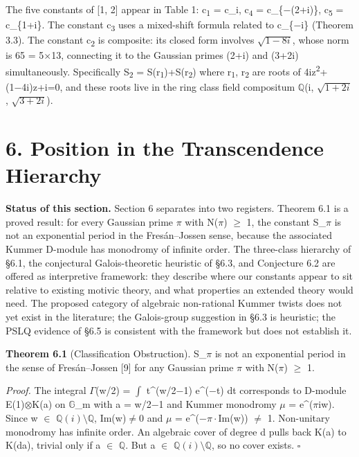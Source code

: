\documentclass[11pt]{article}
\begin{document}
The five constants of {[}1, 2{]} appear in Table 1: c\textsubscript{1} =
c\_i, c\textsubscript{4} = c\_\{−(2+i)\}, c\textsubscript{5} =
c\_\{1+i\}. The constant c\textsubscript{3} uses a mixed-shift formula
related to c\_\{−i\} (Theorem 3.3). The constant c\textsubscript{2} is
composite: its closed form involves \(\sqrt{1−8i}\), whose norm is 65 =
5\(\times\)13, connecting it to the Gaussian primes (2+i) and (3+2i)
simultaneously. Specifically S\textsubscript{2} =
S(r\textsubscript{1})+S(r\textsubscript{2}) where r\textsubscript{1},
r\textsubscript{2} are roots of 4iz\textsuperscript{2}+(1−4i)z+i=0, and
these roots live in the ring class field compositum \(\mathbb{Q}\)(i,
\(\sqrt{1+2i}\), \(\sqrt{3+2i}\)).

\hypertarget{position-in-the-transcendence-hierarchy}{%
\section{6. Position in the Transcendence
Hierarchy}\label{position-in-the-transcendence-hierarchy}}

\textbf{Status of this section.} Section 6 separates into two registers.
Theorem 6.1 is a proved result: for every Gaussian prime \(\pi\) with
N(\(\pi\)) \(\geq\) 1, the constant S\_\(\pi\) is not an exponential
period in the Fresán--Jossen sense, because the associated Kummer
D-module has monodromy of infinite order. The three-class hierarchy of
§6.1, the conjectural Galois-theoretic heuristic of §6.3, and Conjecture
6.2 are offered as interpretive framework: they describe where our
constants appear to sit relative to existing motivic theory, and what
properties an extended theory would need. The proposed category of
algebraic non-rational Kummer twists does not yet exist in the
literature; the Galois-group suggestion in §6.3 is heuristic; the PSLQ
evidence of §6.5 is consistent with the framework but does not establish
it.

\textbf{Theorem 6.1} (Classification Obstruction). S\_\(\pi\) is not an
exponential period in the sense of Fresán--Jossen {[}9{]} for any
Gaussian prime \(\pi\) with N(\(\pi\)) \(\geq\) 1.

\emph{Proof.} The integral \(\Gamma\)(w/2) = \(\int\) t\^{}(w/2−1)
e\^{}(−t) dt corresponds to D-module E(1)\(\otimes\)K(a) on
\(\mathbb{G}\)\_m with a = w/2−1 and Kummer monodromy \(\mu\) =
e\^{}(\(\pi\)iw). Since w \(\in\) \(\mathbb{Q}(i)\setminus \mathbb{Q}\),
Im(w)\(\neq\)0 and \textbar{}\(\mu\)\textbar{} =
e\^{}(−\(\pi\cdot\)Im(w)) \(\neq\) 1. Non-unitary monodromy has infinite
order. An algebraic cover of degree d pulls back K(a) to K(da), trivial
only if a \(\in\) \(\mathbb{Q}\). But a \(\in\)
\(\mathbb{Q}(i)\setminus \mathbb{Q}\), so no cover exists. \(\square\)
\end{document}
